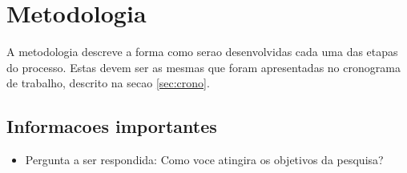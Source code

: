 \documentclass[a4paper,11pt]{article}
\begin{document}
\section{Metodologia}
\label{sec:met}
A metodologia descreve a forma como serao desenvolvidas cada uma das etapas do processo. Estas devem ser as mesmas que foram apresentadas no cronograma de trabalho, descrito na secao \ref{sec:crono}.

\subsection{Informacoes importantes}
\begin{itemize}
\item{Pergunta a ser respondida: Como voce atingira os objetivos da pesquisa?}
\end{itemize}
\end{document}
